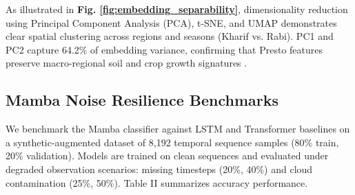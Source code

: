 \documentclass[conference]{IEEEtran}
\begin{document}
\begin{table}[htbp]
\caption{Study Region Profiling}
\label{tab:regions}
\centering
{}
\end{table}

As illustrated in \textbf{Fig. \ref{fig:embedding_separability}}, dimensionality reduction using Principal Component Analysis (PCA), t-SNE, and UMAP demonstrates clear spatial clustering across regions and seasons (Kharif vs. Rabi). PC1 and PC2 capture 64.2\% of embedding variance, confirming that Presto features preserve macro-regional soil and crop growth signatures \cite{b4}.

\subsection{Mamba Noise Resilience Benchmarks}
We benchmark the Mamba classifier against LSTM and Transformer baselines on a synthetic-augmented dataset of 8,192 temporal sequence samples (80\% train, 20\% validation). Models are trained on clean sequences and evaluated under degraded observation scenarios: missing timesteps (20\%, 40\%) and cloud contamination (25\%, 50\%). Table II summarizes accuracy performance.

\begin{table}[htbp]
\caption{Temporal Sequence Classification Accuracy Under Noise (\%)}
\label{tab:resilience}
\centering
{}
\end{table}
\end{document}
